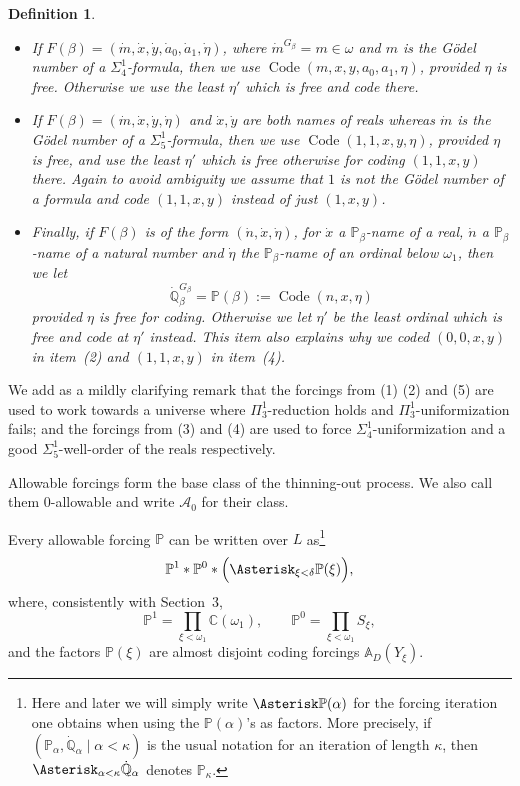 \documentclass[a4paper,11pt]{article}
\newtheorem{definition}[theorem]{Definition}
\newcommand{\forceP}{\mathbb{P}}
\newcommand{\forceQ}{\mathbb{Q}}
\begin{document}
\begin{definition}
\begin{itemize}
    \item[(3)] If $F(\beta)=(\dot m,\dot x,\dot y,\dot a_0,\dot a_1,\dot\eta)$, where $\dot m^{G_\beta}=m\in\omega$ and $m$ is the G\"odel number of a $\Sigma^1_4$-formula, then we use $\operatorname{Code}(m,x,y,a_0,a_1,\eta)$, provided $\eta$ is free. Otherwise we use the least $\eta'$ which is free and code there.

    \item[(4)] If $F(\beta)=(\dot m,\dot x,\dot y,\dot\eta)$ and $\dot x,\dot y$ are both names of reals whereas $\dot m$ is the G\"odel number of a $\Sigma^1_5$-formula, then we use $\operatorname{Code}(1,1,x,y,\eta)$, provided $\eta$ is free, and use the least $\eta'$ which is free otherwise for coding $(1,1,x,y)$ there. Again to avoid ambiguity we assume that $1$ is not the G\"odel number of a formula and code $(1,1,x,y)$ instead of just $(1,x,y)$.

    \item[(5)] Finally, if $F(\beta)$ is of the form $(\dot n,\dot x,\dot\eta)$, for $\dot x$ a $\forceP_\beta$-name of a real, $\dot n$ a $\forceP_\beta$-name of a natural number and $\dot\eta$ the $\forceP_\beta$-name of an ordinal below $\omega_1$, then we let
    \[
    \dot{\forceQ}_\beta^{G_\beta}=\forceP(\beta):=\operatorname{Code}(n,x,\eta)
    \]
    provided $\eta$ is free for coding. Otherwise we let $\eta'$ be the least ordinal which is free and code at $\eta'$ instead. This item also explains why we coded $(0,0,x,y)$ in item~(2) and $(1,1,x,y)$ in item~(4).
    \end{itemize}
    \end{definition}
 We add as a mildly clarifying remark that the forcings from (1) (2) and (5) are used to work towards a universe where $\Pi^1_3$-reduction holds and $\Pi^1_3$-uniformization fails; and the forcings from (3) and (4) are used to force $\Sigma^1_4$-uniformization and a good $\Sigma^1_5$-well-order of the reals respectively.
    
    

Allowable forcings form the base class of the thinning-out process. We also call them $0$-allowable and write $\mathcal A_0$ for their class.
    
    
    Every allowable forcing $\forceP$ can be written over $L$ as\footnote{Here and later we will simply write $\Asterisk \forceP(\alpha)$ for the forcing iteration one obtains when using the $\forceP(\alpha)$'s as factors. More precisely, if $(\forceP_{\alpha},\dot{\forceQ}_{\alpha}\mid\alpha<\kappa)$ is the usual notation for an iteration of length $\kappa$, then $\Asterisk_{\alpha<\kappa}\dot{\forceQ}_{\alpha}$ denotes $\forceP_{\kappa}$.}
\[
\forceP^1\ast\forceP^0\ast
\Bigl(\Asterisk_{\xi<\delta}\forceP(\xi)\Bigr),
\]
where, consistently with Section~3,
\[
\forceP^1=\prod_{\xi<\omega_1}\mathbb C(\omega_1),
\qquad
\forceP^0=\prod_{\xi<\omega_1}S_\xi,
\]
and the factors $\forceP(\xi)$ are almost disjoint coding forcings $\mathbb A_D(Y_\xi)$.
\end{document}
